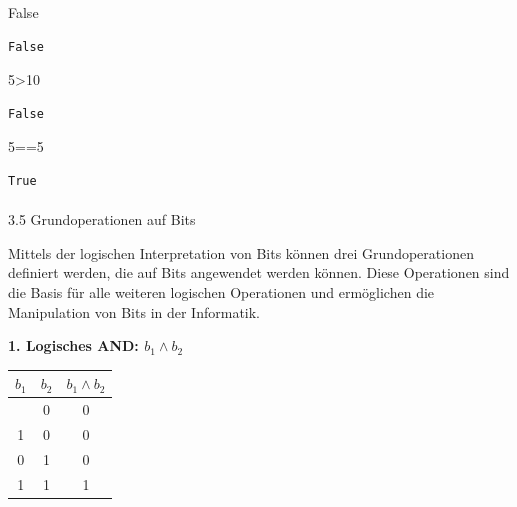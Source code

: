 \documentclass[
  11pt,
  a4paper,
  DIV=11,
  numbers=noendperiod]{scrartcl}
\makeatletter
\let\oldparagraph\paragraph
\renewcommand{\paragraph}{
    \@ifstar
      \xxxParagraphStar
      \xxxParagraphNoStar
  }
\newcommand{\xxxParagraphStar}[1]{\oldparagraph*{#1}\mbox{}}
\newcommand{\xxxParagraphNoStar}[1]{\oldparagraph{#1}\mbox{}}
\newenvironment{Shaded}{\begin{snugshade}}{\end{snugshade}}
\newcommand{\DecValTok}[1]{\textcolor[rgb]{0.68,0.00,0.00}{#1}}
\newcommand{\OperatorTok}[1]{\textcolor[rgb]{0.37,0.37,0.37}{#1}}
\newcommand{\VariableTok}[1]{\textcolor[rgb]{0.07,0.07,0.07}{#1}}
\makeatother
\begin{document}
\begin{Shaded}
\begin{Highlighting}[numbers=left,,]
\VariableTok{False}
\end{Highlighting}
\end{Shaded}

\begin{verbatim}
False
\end{verbatim}

\begin{Shaded}
\begin{Highlighting}[numbers=left,,]
\DecValTok{5}\OperatorTok{\textgreater{}}\DecValTok{10}
\end{Highlighting}
\end{Shaded}

\begin{verbatim}
False
\end{verbatim}

\begin{Shaded}
\begin{Highlighting}[numbers=left,,]
\DecValTok{5}\OperatorTok{==}\DecValTok{5}
\end{Highlighting}
\end{Shaded}

\begin{verbatim}
True
\end{verbatim}

\paragraph{3.5 Grundoperationen auf
Bits}\label{grundoperationen-auf-bits}

Mittels der logischen Interpretation von Bits können drei
Grundoperationen definiert werden, die auf Bits angewendet werden
können. Diese Operationen sind die Basis für alle weiteren logischen
Operationen und ermöglichen die Manipulation von Bits in der Informatik.

\textbf{1. Logisches AND: \(b_1 \land b_2\)}

\begin{longtable}[]{@{}ccc@{}}
\toprule\noalign{}
\(b_1\) & \(b_2\) & \(b_1 \land b_2\) \\
\midrule\noalign{}
\endhead
\bottomrule\noalign{}
\endlastfoot
0 & 0 & 0 \\
1 & 0 & 0 \\
0 & 1 & 0 \\
1 & 1 & 1 \\
\end{longtable}
\end{document}

